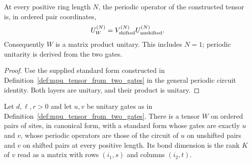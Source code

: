 \begin{lemma}
    \label{lem:mpu_tensor_from_gates_periodic_circuit}
    \leanok
    At every positive ring length $N$, the periodic operator of the
    constructed tensor is, in ordered pair coordinates,
    \begin{align}
        U_W^{(N)}=V_{\rm shifted}^{(N)}U_{\rm unshifted}^{(N)}.
    \end{align}
    Consequently $W$ is a matrix product unitary. This includes $N=1$;
    periodic unitarity is derived from the two gates.
\end{lemma}
\begin{proof}
    \leanok
    Use the supplied standard form constructed in
    Definition~\ref{def:mpu_tensor_from_two_gates} in the general periodic
    circuit identity. Both layers are unitary, and their product is unitary.
\end{proof}

\begin{lemma}
    \label{thm:mpu_standard_form_canonical_representative}
    \leanok
    Let $d,\ell,r>0$ and let $u,v$ be unitary gates as in
    Definition~\ref{def:mpu_tensor_from_two_gates}. There is a tensor $W$ on
    ordered pairs of sites, in canonical form, with a standard form whose gates
    are exactly $u$ and $v$, whose periodic operators are those of the circuit
    of $u$ on unshifted pairs and $v$ on shifted pairs at every positive length.
    Its bond dimension is the rank $K$ of $v$ read as a matrix with rows
    $(i_1,s)$ and columns $(i_2,t)$.
\end{lemma}


